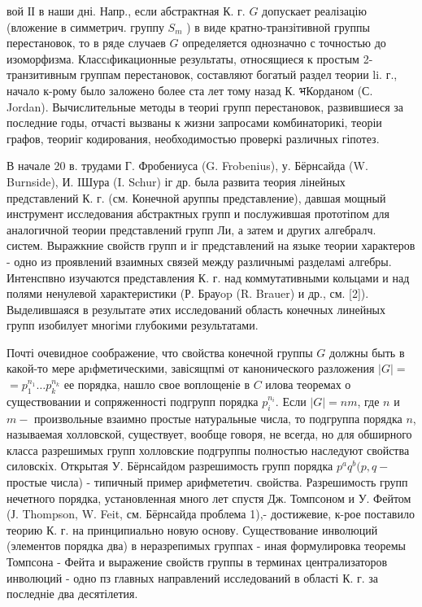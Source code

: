 \documentclass[10pt]{article}
\begin{document}
вой ІІ в наши дні. Напр., если абстрактная К. г. $G$ допускает реалізацію (вложение в симметрич. группу $S_{m}$ ) в виде кратно-транзітивной группы перестановок, то в ряде случаев $G$ определяется однозначно с точностью до изоморфизма. Классıфикационные результаты, относящиеся к простым 2-транзитивным группам перестановок, составляют богатый раздел теории li. г., начало к-рому было заложено более ста лет тому назад К. भКорданом (С. Jordan). Вычислительные методы в теориі групп перестановок, развившиеся за последние годы, отчасті вызваны к жизни запросами комбинаторикі, теоріи графов, теориіг кодирования, необходимостью проверкі различных гіпотез.



В начале 20 в. трудами Г. Фробениуса (G. Frobenius), у. Бёрнсайда (W. Burnside), И. IШура (I. Schur) іг др. была развита теория лінейных представлений К. г. (см. Конечной аруппы представление), давшая мощный инструмент исследования абстрактных групп и послужившая прототіпом для аналогичной теории представлений групп Ли, а затем и других алгебралч. систем. Выражкние свойств групп и іг представлений на языке теории характеров - одно из проявлений взаимных связей между различнымі разделамі алгебры. Интенспвно изучаются представления К. г. над коммутативными кольцами и над полями ненулевой характеристики (Р. Брауop (R. Brauer) и др., см. [2]). Выделившаяся в резулытате әтих исследований область конечных линейных групп изобилует многіми глубокими результатами.



Почті очевидное соображение, что свойства конечной группы $G$ должны быть в какой-то мере арıфметическими, завісящпмі от канонического разложения $|G|=$ $=p_{1}^{n_{1}} \ldots p_{k}^{n_{k}}$ ее порядка, нашло свое воплощеніе в $C$ илова теоремах о существовании и сопряженності подгрупп порядка $p_{i}^{n_{i}}$. Если $|G|=n m$, где $n$ и $m-$ произвольные взаимно простые натуральные числа, то подгруппа порядка $n$, называемая холловской, существует, вообще говоря, не всегда, но для обширного класса разрешимых групп холловские подгруппы полностью наследуют свойства силовскіх. Открытая У. Бёрнсайдом разрешимость групп порядка $p^{a} q^{b}(p, q-$ простые числа) - типичный пример арифмететич. свойства. Разрешимость групп нечетного порядка, установленная много лет спустя Дж. Томпсоном и У. Фейтом (Ј. Thompson, W. Feit, см. Бёрнсайда проблема 1),- достижевие, к-рое поставило теорию $К$. г. на принципиально новую основу. Существование инволюций (элементов порядка два) в неразрепимых группах - иная формулировка теоремы Томпсона - Фейта и выражение свойств группы в терминах централизаторов инволюций - одно пз главных направлений исследований в області К. г. за последніе два десятілетия.
\end{document}

